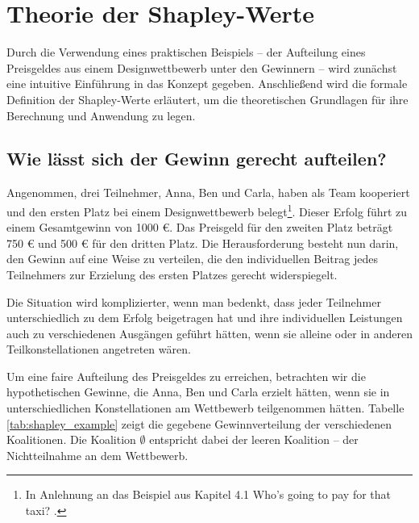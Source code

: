 \chapter{Theorie der Shapley-Werte}

Durch die Verwendung eines praktischen Beispiels – der Aufteilung 
eines Preisgeldes aus einem Designwettbewerb unter den Gewinnern – wird zunächst eine intuitive Einführung 
in das Konzept gegeben. Anschließend wird die formale Definition der Shapley-Werte erläutert, um die 
theoretischen Grundlagen für ihre Berechnung und Anwendung zu legen.

\section{Wie lässt sich der Gewinn gerecht aufteilen?}

Angenommen, drei Teilnehmer, Anna, Ben und Carla, haben als Team kooperiert und den ersten Platz bei einem Designwettbewerb belegt\footnote{In Anlehnung an das Beispiel aus Kapitel 4.1 \glqq{}Who's going to pay for that taxi?\grqq{} \cite[S.17-20]{Molnar_2023}.}. 
Dieser Erfolg führt zu einem Gesamtgewinn von 1000 \euro. Das Preisgeld für den zweiten Platz beträgt 750 \euro{} und 500 \euro{} für den dritten Platz.
Die Herausforderung besteht nun darin, den Gewinn auf eine Weise zu verteilen, die den individuellen Beitrag jedes Teilnehmers 
zur Erzielung des ersten Platzes gerecht widerspiegelt.

Die Situation wird komplizierter, wenn man bedenkt, dass jeder Teilnehmer unterschiedlich zu dem Erfolg 
beigetragen hat und ihre individuellen Leistungen auch zu verschiedenen Ausgängen geführt hätten, 
wenn sie alleine oder in anderen Teilkonstellationen angetreten wären.

Um eine faire Aufteilung des Preisgeldes zu erreichen, betrachten wir die hypothetischen Gewinne, 
die Anna, Ben und Carla erzielt hätten, wenn sie in unterschiedlichen Konstellationen am Wettbewerb teilgenommen hätten.
Tabelle \ref{tab:shapley_example} zeigt die gegebene Gewinnverteilung der verschiedenen Koalitionen. Die Koalition $\emptyset$ entspricht
dabei der leeren Koalition -- der Nichtteilnahme an dem Wettbewerb.


